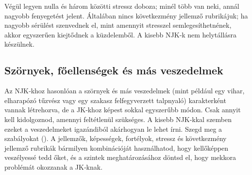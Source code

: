 Végül legyen nulla és három közötti stressz doboza; minél több van neki, annál nagyobb fenyegetést jelent. Általában nincs következmény jellemző rubrikájuk; ha nagyobb sérülést szenvednek el, mint amennyit stresszel semlegesíthetnének, akkor egyszerűen kiejtődnek a küzdelemből. A kisebb NJK‑k nem helytállásra készülnek.

\subsection{Szörnyek, főellenségek és más veszedelmek}

Az NJK‑khoz hasonlóan a szörnyek és más veszedelmek (mint például egy vihar, elharapózó tűzvész vagy egy szakasz felfegyverzett talpnyaló) karakterként vannak létrehozva, de a JK‑khoz képest sokkal egyszerűbb módon. Csak annyit kell kidolgoznod, amennyi feltétlenül szükséges. A kisebb NJK‑kkal szemben ezeket a veszedelmeket igazándiból akárhogyan le lehet írni. Szegd meg a szabályokat (). A jellemzők, képességek, fortélyok, stressz és következmény jellemző rubrikák bármilyen kombinációját használhatod, hogy kellőképpen veszélyessé tedd őket, és a szintek meghatározásához döntsd el, hogy mekkora problémát okozzanak a JK‑knak.

